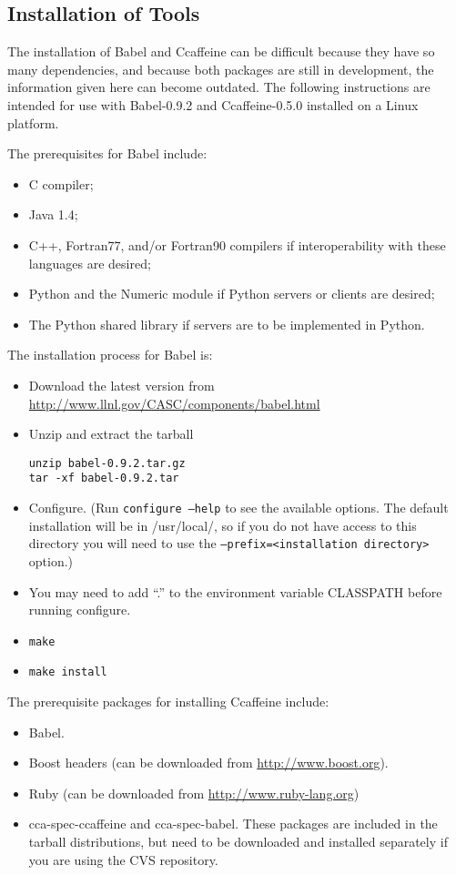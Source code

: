 \documentclass[doublespacing,12pt]{article}
\begin{document}
\subsection{Installation of Tools}
The installation of Babel and Ccaffeine can be difficult because they have 
so many dependencies, and because both packages are
still in development, the information given here can become outdated.  
The following instructions are intended for use with Babel-0.9.2 and Ccaffeine-0.5.0 installed on a Linux platform.

The prerequisites for Babel include:
\begin{itemize}
\item C compiler;
\item Java 1.4;

\item C++, Fortran77, and/or Fortran90 compilers if interoperability with these languages are desired;
\item Python and the Numeric module if Python servers or clients are desired;

\item The Python shared library if servers are to be implemented in Python.

\end{itemize}

\noindent The installation process for Babel is:
\begin{itemize}
\item Download the latest version from \url{http://www.llnl.gov/CASC/components/babel.html}
\item Unzip and extract the tarball 
\begin{verbatim}
unzip babel-0.9.2.tar.gz 
tar -xf babel-0.9.2.tar
\end{verbatim} 
\item Configure. (Run \texttt{configure --help} to see the available
  options.  The default installation will be in /usr/local/, so if you
  do not have access to this directory you will need to use the
  \texttt{--prefix=<installation directory>} option.)
\item You may need to add ``.'' to the environment variable CLASSPATH before running configure.
\item \texttt{make}
\item \texttt{make install}
\end{itemize}

\noindent The prerequisite packages for installing Ccaffeine include:
\begin{itemize}
\item Babel.
\item Boost headers (can be downloaded from \url{http://www.boost.org}).
\item Ruby (can be downloaded from \url{http://www.ruby-lang.org})
\item cca-spec-ccaffeine and cca-spec-babel.  These packages are included in the tarball distributions, but need to be downloaded and installed separately if you are using the CVS repository.
\end{itemize}
\end{document}
